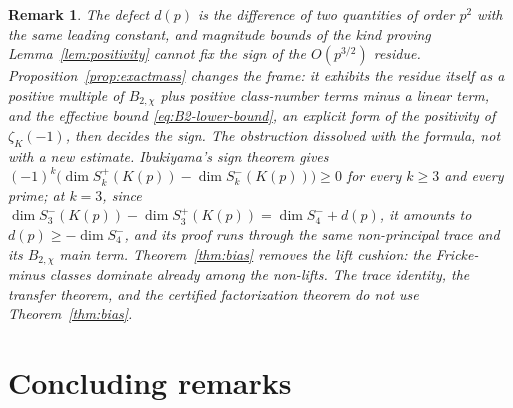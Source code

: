 \documentclass[10pt,a4paper]{amsart}
\newtheorem{remark}[theorem]{Remark}
\begin{document}
	\begin{remark}\label{rem:sign-accessible}
		The defect $d(p)$ is the difference of two quantities of order $p^2$
		with the same leading constant, and magnitude bounds of the kind
		proving Lemma~\ref{lem:positivity} cannot fix the sign of the
		$O(p^{3/2})$ residue. Proposition~\ref{prop:exactmass} changes the
		frame: it exhibits the residue itself as a positive multiple of
		$B_{2,\chi}$ plus positive class-number terms minus a linear term,
		and the effective bound \eqref{eq:B2-lower-bound}, an explicit form
		of the positivity of $\zeta_K(-1)$, then decides the sign. The
		obstruction dissolved with the formula, not with a new estimate.
		Ibukiyama's sign theorem \cite[Thm.~7.1]{Ibukiyama-dim} gives
		$(-1)^k\bigl(\dim S_k^{+}(K(p))-\dim S_k^{-}(K(p))\bigr)\ge0$ for every
		$k\ge3$ and every prime; at $k=3$, since
		$\dim S_3^{-}(K(p))-\dim S_3^{+}(K(p))=\dim S_4^{-}+d(p)$, it amounts to
		$d(p)\ge-\dim S_4^{-}$, and its proof runs through the same
		non-principal trace and its $B_{2,\chi}$ main term.
		Theorem~\ref{thm:bias} removes the lift cushion: the Fricke-minus
		classes dominate already among the non-lifts. The
		trace identity, the transfer theorem, and the certified factorization
		theorem do not use Theorem~\ref{thm:bias}.
	\end{remark}
	
	\section{Concluding remarks}
	\label{sec:concl}
	
\end{document}
